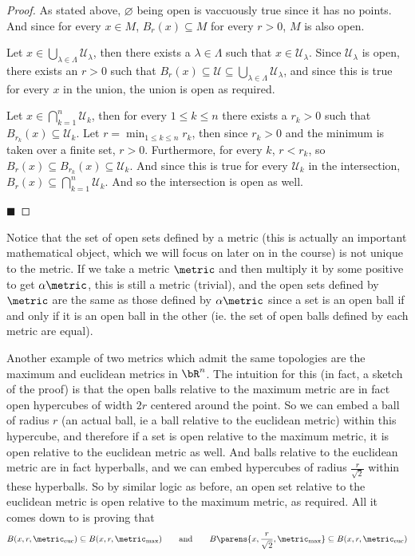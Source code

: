 \documentclass[10pt]{article}
\def\mU{\mathcal{U}}
\begin{document}
\begin{proof}

    \benum
        \item As stated above, $\varnothing$ being open is vaccuously true since it has no points.
        And since for every $x\in M$, $B_r(x)\subseteq M$ for every $r>0$, $M$ is also open.
        \item Let $x\in\bigcup_{\lambda\in\Lambda}\mU_\lambda$, then there exists a $\lambda\in\Lambda$ such that $x\in\mU_\lambda$.
        Since $\mU_\lambda$ is open, there exists an $r>0$ such that $B_r(x)\subseteq\mU\subseteq\bigcup_{\lambda\in\Lambda}\mU_\lambda$, and since this is true for every $x$ in the union, the union is
        open as required.
        \item Let $x\in\bigcap_{k=1}^n\mU_k$, then for every $1\leq k\leq n$ there exists a $r_k>0$ such that $B_{r_k}(x)\subseteq\mU_k$.
        Let $r=\min_{1\leq k\leq n}r_k$, then since $r_k>0$ and the minimum is taken over a finite set, $r>0$.
        Furthermore, for every $k$, $r<r_k$, so $B_r(x)\subseteq B_{r_k}(x)\subseteq\mU_k$.
        And since this is true for every $\mU_k$ in the intersection, $B_r(x)\subseteq\bigcap_{k=1}^n\mU_k$.
        And so the intersection is open as well.
    \eenum

    \hfill$\blacksquare$

\end{proof}

Notice that the set of open sets defined by a metric (this is actually an important mathematical object, which we will focus on later on in the course) is not unique to the metric.
If we take a metric $\metric$ and then multiply it by some positive to get $\alpha\metric$, this is still a metric (trivial), and the open sets defined by $\metric$ are the same as those defined by
$\alpha\metric$ since a set is an open ball if and only if it is an open ball in the other (ie. the set of open balls defined by each metric are equal).

Another example of two metrics which admit the same topologies are the maximum and euclidean metrics in $\bR^n$.
The intuition for this (in fact, a sketch of the proof) is that the open balls relative to the maximum metric are in fact open hypercubes of width $2r$ centered around the point.
So we can embed a ball of radius $r$ (an actual ball, ie a ball relative to the euclidean metric) within this hypercube, and therefore if a set is open relative to the maximum metric, it is open relative
to the euclidean metric as well.
And balls relative to the euclidean metric are in fact hyperballs, and we can embed hypercubes of radius $\frac r{\sqrt2}$ within these hyperballs.
So by similar logic as before, an open set relative to the euclidean metric is open relative to the maximum metric, as required.
All it comes down to is proving that
\[ B(x,r,\metric_{\rm euc}) \subseteq B(x,r,\metric_{\rm max})\qquad\text{and}\qquad B\parens{x,\frac r{\sqrt 2},\metric_{\rm max}}\subseteq B(x,r,\metric_{\rm euc}) \]
\end{document}
